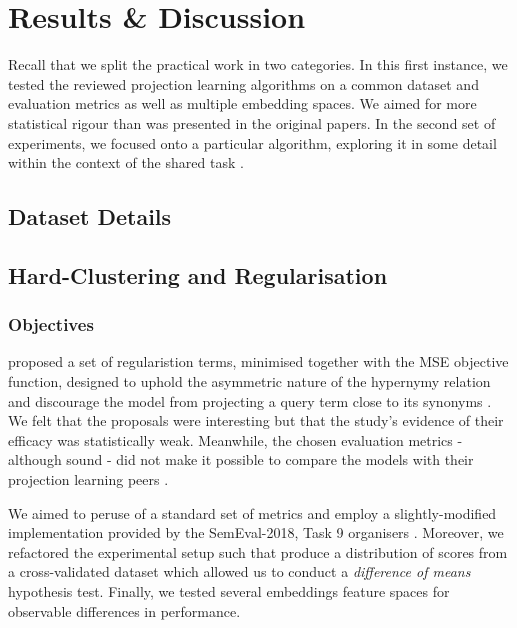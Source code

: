 \chapter{Results \& Discussion}
Recall that we split the practical work in two categories.  In this first instance, we tested the reviewed projection learning algorithms on a common dataset and evaluation metrics as well as multiple embedding spaces.  We aimed for more statistical rigour than was presented in the original papers.  In the second set of experiments, we focused onto a particular algorithm, exploring it in some detail within the context of the shared task \citep{camacho2018semeval}.  

\section{Dataset Details}


\section{Hard-Clustering and Regularisation}
\subsection{Objectives}
\citeauthor{ustalov2017negative} proposed a set of regularistion terms, minimised together with the \ac{MSE} objective function, designed to uphold the asymmetric nature of the hypernymy relation and discourage the model from projecting a query term close to its synonyms \citep{ustalov2017negative}.  We felt that the proposals were interesting but that the study's evidence of their efficacy was statistically weak.  Meanwhile, the chosen evaluation metrics - although sound - did not make it possible to compare the models with their projection learning peers \citep{yamane2016distributional, bernier2018crim}.  

We aimed to peruse of a standard set of metrics and employ a slightly-modified implementation provided by the SemEval-2018, Task 9 organisers \citep{camacho2018semeval}.  Moreover, we refactored the experimental setup such that produce a distribution of scores from a cross-validated dataset which allowed us to conduct a \textit{difference of means} hypothesis test.  Finally, we tested several embeddings feature spaces for observable differences in performance.

